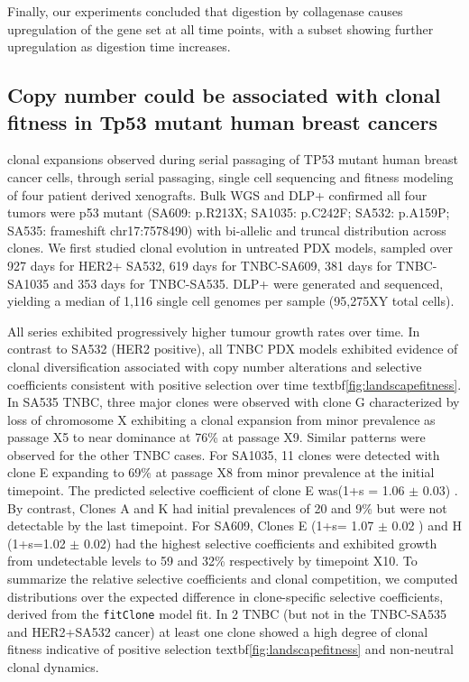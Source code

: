  Finally, our experiments concluded that digestion by collagenase causes upregulation of the gene set at all time points, with a subset showing further upregulation as digestion time increases.

\subsection{Copy number could be associated with clonal fitness in Tp53 mutant human breast cancers}
 clonal expansions observed during serial passaging of TP53 mutant human breast cancer cells, through serial passaging, single cell sequencing and fitness modeling of four patient derived xenografts. Bulk WGS and DLP+ confirmed all four tumors were p53 mutant (SA609: p.R213X; SA1035: p.C242F; SA532: p.A159P; SA535: frameshift chr17:7578490) with bi-allelic and truncal distribution across clones. We first studied clonal evolution in untreated PDX models, sampled over 927 days for HER2+ SA532, 619 days for TNBC-SA609, 381 days for TNBC-SA1035 and 353 days for TNBC-SA535. DLP+ were generated and sequenced, yielding a median of 1,116 single cell genomes per sample (95,275XY total cells). 

All series exhibited progressively higher tumour growth rates over time. In contrast to SA532 (HER2 positive), all TNBC PDX models exhibited evidence of clonal diversification associated with copy number alterations and selective coefficients consistent with positive selection over time textbf{\autoref{fig:landscapefitness}}.  In SA535 TNBC, three major clones were observed with clone G characterized by loss of chromosome X exhibiting a clonal expansion from minor prevalence as passage X5 to near dominance at 76\% at passage X9.  Similar patterns were observed for the other TNBC cases.  For SA1035, 11 clones were detected with clone E expanding to 69\% at passage X8 from minor prevalence at the initial timepoint.  The predicted selective coefficient of clone E was(1+s = 1.06 $\pm$ 0.03) . By contrast, Clones A and K had initial prevalences of 20 and 9\% but were not detectable by the last timepoint. For SA609, Clones E  (1+s= 1.07 $\pm$ 0.02 ) and H (1+s=1.02 $\pm$ 0.02) had the highest selective coefficients and exhibited growth from undetectable levels to 59 and 32\% respectively by timepoint X10. To summarize the relative selective coefficients and clonal competition, we computed distributions over the expected difference in clone-specific selective coefficients, derived from the \texttt{fitClone} model fit. In 2 TNBC (but not in the TNBC-SA535 and HER2+SA532 cancer) at least one clone showed a high degree of clonal fitness indicative of positive selection textbf{\autoref{fig:landscapefitness}} and non-neutral clonal dynamics.


